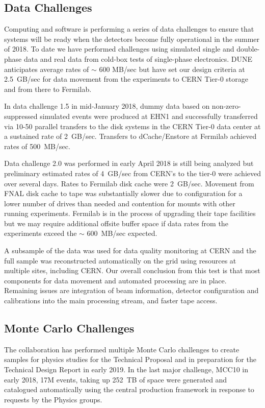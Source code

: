 \subsection{Data Challenges}

Computing and software is performing a series of data challenges to ensure that systems will be ready when the detectors become fully operational in the summer of 2018.  To date we have performed challenges using simulated single and double-phase data and real data from cold-box tests of single-phase electronics.   DUNE anticipates average rates of $\sim$ 600 MB/sec but have set our design criteria at 2.5~GB/sec for data movement from the experiments to CERN Tier-0 storage and from there to Fermilab. 

In data challenge 1.5 in mid-January 2018, dummy data based on non-zero-suppressed simulated events were produced at EHN1 and successfully transferred via 10-50 parallel transfers to the  disk systems in the CERN Tier-0 data center at a sustained rate of 2~GB/sec.    Transfers to dCache/Enstore at Fermilab achieved rates of 500~MB/sec.  

Data challenge 2.0 was performed in early April 2018 is still being analyzed but preliminary estimated  rates of 4~GB/sec from CERN's   to the tier-0 were achieved over several days. Rates to Fermilab disk cache were 2~GB/sec.  Movement from FNAL disk cache to tape was substantially slower due to configuration for a lower number of drives than needed and contention for mounts with other running experiments.   Fermilab is in the process of upgrading their tape facilities but we may require additional offsite buffer space if data rates from the experiments exceed the $\sim$ 600~MB/sec expected. 

A subsample of the data was used for data quality monitoring at CERN and the full sample was reconstructed automatically on the grid using resources at multiple sites, including CERN. 
Our overall conclusion from this test is that most components for data movement and automated processing are in place.  Remaining issues are integration of beam information, detector configuration and calibrations into the main processing stream, and faster tape access. 

\subsection{Monte Carlo Challenges}
The collaboration has performed multiple Monte Carlo challenges to create samples for physics studies for the Technical Proposal and in preparation for the Technical Design Report in early 2019.  In the last major challenge,  MCC10 in early 2018, 17M events, taking up 252~TB of space were generated and catalogued automatically using the central  production framework in response to requests by the Physics groups. 

